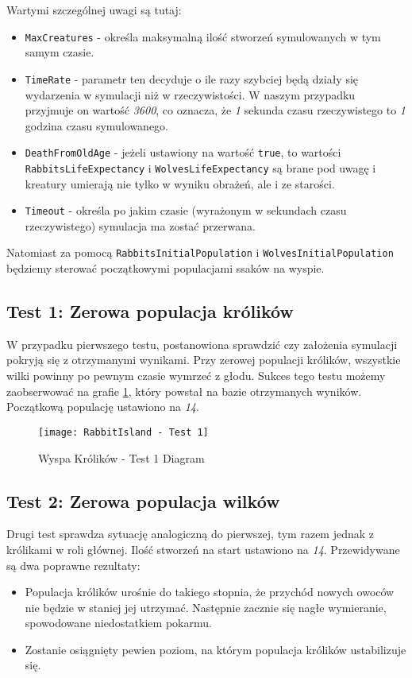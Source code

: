 Wartymi szczególnej uwagi są tutaj:
\begin{itemize}
	\item \texttt{MaxCreatures} - określa maksymalną ilość stworzeń symulowanych w tym samym czasie.
	\item \texttt{TimeRate} - parametr ten decyduje o ile razy szybciej będą działy się wydarzenia w symulacji niż w rzeczywistości. W naszym przypadku przyjmuje on wartość \emph{3600}, co oznacza, że \emph{1} sekunda czasu rzeczywistego to \emph{1} godzina czasu symulowanego.
	\item \texttt{DeathFromOldAge} - jeżeli ustawiony na wartość \texttt{true}, to wartości \texttt{RabbitsLifeExpectancy} i \texttt{WolvesLifeExpectancy} są brane pod uwagę i kreatury umierają nie tylko w wyniku obrażeń, ale i ze starości.
	\item \texttt{Timeout} - określa po jakim czasie (wyrażonym w sekundach czasu rzeczywistego) symulacja ma zostać przerwana.
\end{itemize}

Natomiast za pomocą \texttt{RabbitsInitialPopulation} i \texttt{WolvesInitialPopulation} będziemy sterować początkowymi populacjami ssaków na wyspie.

\subsection{Test 1: Zerowa populacja królików}

\par W przypadku pierwszego testu, postanowiona sprawdzić czy założenia symulacji pokryją się z otrzymanymi wynikami. Przy zerowej populacji królików, wszystkie wilki powinny po pewnym czasie wymrzeć z głodu. Sukces tego testu możemy zaobserwować na grafie \ref{fig:rabbitIslandTest1Diagram1}, który powstał na bazie otrzymanych wyników. Początkową populację ustawiono na \emph{14}.

\begin{figure}
	\texttt{[image: RabbitIsland - Test 1]}
	\label{fig:rabbitIslandTest1Diagram1}
	\caption{Wyspa Królików - Test 1 Diagram}
\end{figure}

\subsection{Test 2: Zerowa populacja wilków}

\par Drugi test sprawdza sytuację analogiczną do pierwszej, tym razem jednak z królikami w roli głównej. Ilość stworzeń na start ustawiono na \emph{14}. Przewidywane są dwa poprawne rezultaty:
\begin{itemize}
	\item Populacja królików urośnie do takiego stopnia, że przychód nowych owoców nie będzie w staniej jej utrzymać. Następnie zacznie się nagłe wymieranie, spowodowane niedostatkiem pokarmu.
	\item Zostanie osiągnięty pewien poziom, na którym populacja królików ustabilizuje się.
\end{itemize}

